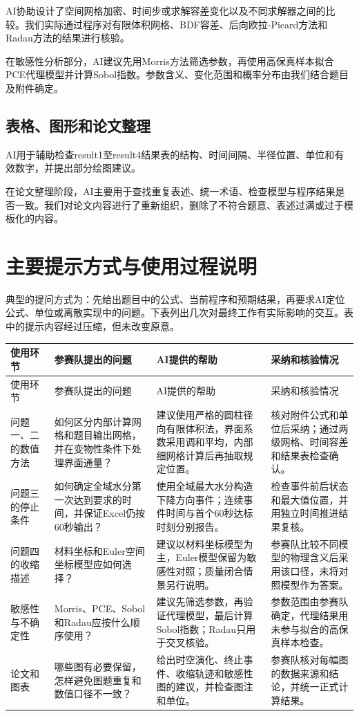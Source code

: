 \documentclass[UTF8,12pt,a4paper]{ctexart}
\begin{document}
AI协助设计了空间网格加密、时间步或求解容差变化以及不同求解器之间的比较。我们实际通过程序对有限体积网格、BDF容差、后向欧拉-Picard方法和Radau方法的结果进行核验。

在敏感性分析部分，AI建议先用Morris方法筛选参数，再使用高保真样本拟合PCE代理模型并计算Sobol指数。参数含义、变化范围和概率分布由我们结合题目及附件确定。

\subsection{表格、图形和论文整理}

AI用于辅助检查result1至result4结果表的结构、时间间隔、半径位置、单位和有效数字，并提出部分绘图建议。

在论文整理阶段，AI主要用于查找重复表述、统一术语、检查模型与程序结果是否一致。我们对论文内容进行了重新组织，删除了不符合题意、表述过满或过于模板化的内容。

\section{主要提示方式与使用过程说明}

典型的提问方式为：先给出题目中的公式、当前程序和预期结果，再要求AI定位公式、单位或离散实现中的问题。下表列出几次对最终工作有实际影响的交互。表中的提示内容经过压缩，但未改变原意。

\begingroup
\small
\setlength{\tabcolsep}{4pt}
\renewcommand{\arraystretch}{1.08}
\begin{longtable}{L{2.4cm} L{4.0cm} L{4.1cm} L{4.1cm}}
\toprule
使用环节 & 参赛队提出的问题 & AI提供的帮助 & 采纳和核验情况 \\
\midrule
\endfirsthead
\toprule
使用环节 & 参赛队提出的问题 & AI提供的帮助 & 采纳和核验情况 \\
\midrule
\endhead
问题一、二的数值方法 & 如何区分内部计算网格和题目输出网格，并在变物性条件下处理界面通量？ & 建议使用严格的圆柱径向有限体积法，界面系数采用调和平均，内部细网格计算后再抽取规定位置。 & 核对附件公式和单位后采纳；通过两级网格、时间容差和结果表检查确认。 \\
\addlinespace
问题三的停止条件 & 如何确定全域水分第一次达到要求的时间，并保证Excel仍按60秒输出？ & 使用全域最大水分构造下降方向事件；连续事件时间与首个60秒达标时刻分别报告。 & 检查事件前后状态和最大值位置，并用独立时间推进结果复核。 \\
\addlinespace
问题四的收缩描述 & 材料坐标和Euler空间坐标模型应如何选择？ & 建议以材料坐标模型为主，Euler模型保留为敏感性对照；质量闭合情景另行说明。 & 参赛队比较不同模型的物理含义后采用该口径，未将对照模型作为答案。 \\
\addlinespace
敏感性与不确定性 & Morris、PCE、Sobol和Radau应按什么顺序使用？ & 建议先筛选参数，再验证代理模型，最后计算Sobol指数；Radau只用于交叉核验。 & 参数范围由参赛队确定，代理结果用未参与拟合的高保真样本检查。 \\
\addlinespace
论文和图表 & 哪些图有必要保留，怎样避免图题重复和数值口径不一致？ & 给出时空演化、终止事件、收缩轨迹和敏感性图的建议，并检查图注和单位。 & 参赛队核对每幅图的数据来源和结论，并统一正式计算结果。 \\
\bottomrule
\end{longtable}
\endgroup
\end{document}
